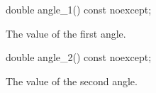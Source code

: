 \begin{itemdecl}
    double angle_1() const noexcept;
\end{itemdecl}
\begin{itemdescr}
	\pnum
	\returns
	The value of the first angle.
\end{itemdescr}

\begin{itemdecl}
    double angle_2() const noexcept;
\end{itemdecl}
\begin{itemdescr}
	\pnum
	\returns
	The value of the second angle.
\end{itemdescr}
